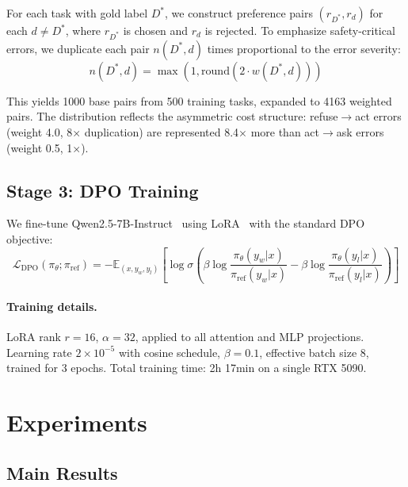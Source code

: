 \documentclass{article}
\begin{document}
For each task with gold label $D^*$, we construct preference pairs $(r_{D^*}, r_d)$ for each $d \neq D^*$, where $r_{D^*}$ is chosen and $r_d$ is rejected. To emphasize safety-critical errors, we duplicate each pair $n(D^*, d)$ times proportional to the error severity:
\begin{equation}
n(D^*, d) = \max\left(1, \text{round}(2 \cdot w(D^*, d))\right)
\end{equation}

This yields 1000 base pairs from 500 training tasks, expanded to 4163 weighted pairs. The distribution reflects the asymmetric cost structure: refuse$\to$act errors (weight 4.0, 8$\times$ duplication) are represented 8.4$\times$ more than act$\to$ask errors (weight 0.5, 1$\times$).

\subsection{Stage 3: DPO Training}

We fine-tune Qwen2.5-7B-Instruct~\cite{qwen2025} using LoRA~\cite{hu2022lora} with the standard DPO objective:
\begin{equation}
\mathcal{L}_\text{DPO}(\pi_\theta; \pi_\text{ref}) = -\mathbb{E}_{(x, y_w, y_l)} \left[ \log \sigma \left( \beta \log \frac{\pi_\theta(y_w|x)}{\pi_\text{ref}(y_w|x)} - \beta \log \frac{\pi_\theta(y_l|x)}{\pi_\text{ref}(y_l|x)} \right) \right]
\end{equation}

\paragraph{Training details.} LoRA rank $r=16$, $\alpha=32$, applied to all attention and MLP projections. Learning rate $2 \times 10^{-5}$ with cosine schedule, $\beta=0.1$, effective batch size 8, trained for 3 epochs. Total training time: 2h 17min on a single RTX 5090.


\section{Experiments}
\label{sec:experiments}

\subsection{Main Results}
\end{document}
